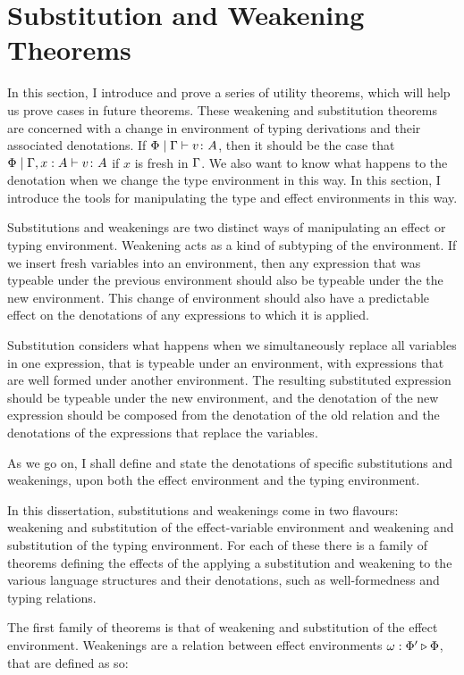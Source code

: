 \documentclass{Report}
\begin{document}
\section{Substitution and Weakening Theorems}

In this section, I introduce and prove a series of utility theorems, which will help us prove cases in future theorems. These weakening and substitution theorems are concerned with a change in environment of typing derivations and their associated denotations. If $\Phi\mid\Gamma \vdash v \colon A$, then it should be the case that $\Phi\mid\Gamma, x: A \vdash v \colon A$ if $x$ is fresh in $\Gamma$. We also want to know what happens to the denotation when we change the type environment in this way. In this section, I introduce the tools for manipulating the type and effect environments in this way.

Substitutions and weakenings are two distinct ways of manipulating an effect or typing environment. Weakening acts as a kind of subtyping of the environment. If we insert fresh variables into an environment, then any expression that was typeable under the previous environment should also be typeable under the the new environment. This change of environment should also have a predictable effect on the denotations of any expressions to which it is applied.

Substitution considers what happens when we simultaneously replace all variables in one expression, that is typeable under an environment, with expressions that are well formed under another environment. The resulting substituted expression should be typeable under the new environment, and the denotation of the new expression should be composed from the denotation of the old relation and the denotations of the expressions that replace the variables. 

As we go on, I shall define and state the denotations of specific substitutions and weakenings, upon both the effect environment and the typing environment.

In this dissertation, substitutions and weakenings come in two flavours: weakening and substitution of the effect-variable environment and weakening and substitution of the typing environment. For each of these there is a family of theorems defining the effects of the applying a substitution and weakening to the various language structures and their denotations, such as well-formedness and typing relations.


The first family of theorems is that of weakening and substitution of the effect environment. Weakenings are a relation between effect environments $\omega : \Phi' \triangleright \Phi$, that are defined as so:
\end{document}

